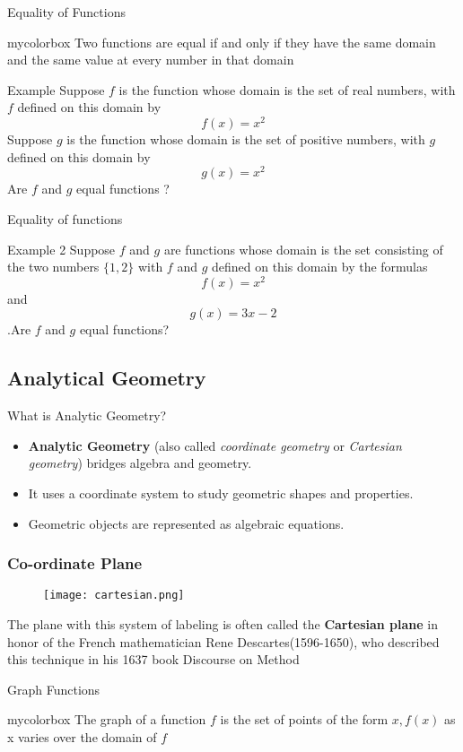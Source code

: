 \begin{frame}{Equality of Functions}
  \begin{beamercolorbox}[wd=\textwidth,rounded=true,shadow=true]{mycolorbox}
    Two functions are equal if and only if they have the same domain and the same value at every number in that domain
  \end{beamercolorbox}
  \begin{exampleblock}{Example}
    Suppose \(f\) is the function whose domain is the set of real numbers, with \(f\) defined
    on this domain by
    \[f (x) = x^2\]
    Suppose \(g\) is the function whose domain is the set of positive numbers, with \(g\)
    defined on this domain by
    \[g(x) = x^2\]
    Are \(f\) and \(g\) equal functions ?
  \end{exampleblock}
\end{frame}
\begin{frame}{Equality of functions}
  \begin{exampleblock}{Example 2}
    Suppose \(f\) and \(g\) are functions whose domain is the set consisting of the two numbers \(\{1, 2\}\) with \(f\) and \(g\) defined on this domain by the formulas
\[f (x) = x^2\] and \[g(x) = 3x-2\].Are \(f\) and \(g\) equal functions?
  \end{exampleblock}
\end{frame}
\subsection{Analytical Geometry}
\begin{frame}{What is Analytic Geometry?}
  \begin{itemize}
      \item \textbf{Analytic Geometry} (also called \textit{coordinate geometry} or \textit{Cartesian geometry}) bridges algebra and geometry.
      \item It uses a coordinate system to study geometric shapes and properties.
      \item Geometric objects are represented as algebraic equations.
  \end{itemize}
\end{frame}
\begin{frame}
  \frametitle{Co-ordinate Plane}
  \begin{figure}[h]    
      \centering
      \texttt{[image: cartesian.png]}
\end{figure}
The plane with this system of labeling is often called the \textbf{Cartesian plane} in honor of the French mathematician Rene Descartes(1596-1650), who described this technique in his 1637 book Discourse on Method
\end{frame}
\begin{frame}{Graph Functions}
  \begin{beamercolorbox}[wd=\textwidth,rounded=true,shadow=true]{mycolorbox}
The graph of a function \(f\) is the set of points of the form \(x, f (x)\) as x varies
over the domain of \(f\)
  \end{beamercolorbox}
\end{frame}

